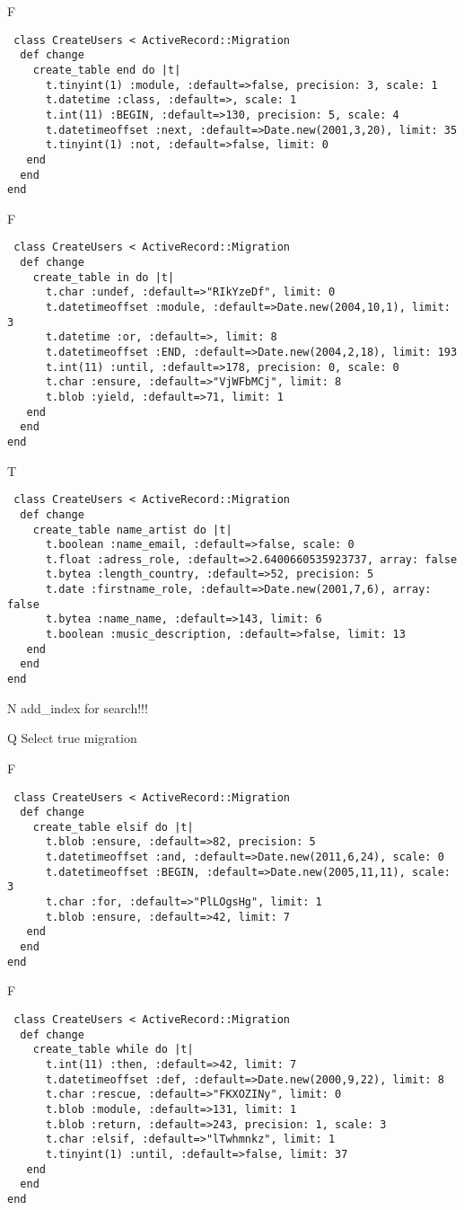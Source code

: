 F
\begin{verbatim}
 class CreateUsers < ActiveRecord::Migration 
  def change 
    create_table end do |t| 
      t.tinyint(1) :module, :default=>false, precision: 3, scale: 1
      t.datetime :class, :default=>, scale: 1
      t.int(11) :BEGIN, :default=>130, precision: 5, scale: 4
      t.datetimeoffset :next, :default=>Date.new(2001,3,20), limit: 35
      t.tinyint(1) :not, :default=>false, limit: 0
   end 
  end 
end
\end{verbatim}

F
\begin{verbatim}
 class CreateUsers < ActiveRecord::Migration 
  def change 
    create_table in do |t| 
      t.char :undef, :default=>"RIkYzeDf", limit: 0
      t.datetimeoffset :module, :default=>Date.new(2004,10,1), limit: 3
      t.datetime :or, :default=>, limit: 8
      t.datetimeoffset :END, :default=>Date.new(2004,2,18), limit: 193
      t.int(11) :until, :default=>178, precision: 0, scale: 0
      t.char :ensure, :default=>"VjWFbMCj", limit: 8
      t.blob :yield, :default=>71, limit: 1
   end 
  end 
end
\end{verbatim}

T
\begin{verbatim}
 class CreateUsers < ActiveRecord::Migration 
  def change 
    create_table name_artist do |t| 
      t.boolean :name_email, :default=>false, scale: 0
      t.float :adress_role, :default=>2.6400660535923737, array: false
      t.bytea :length_country, :default=>52, precision: 5
      t.date :firstname_role, :default=>Date.new(2001,7,6), array: false
      t.bytea :name_name, :default=>143, limit: 6
      t.boolean :music_description, :default=>false, limit: 13
   end 
  end 
end
\end{verbatim}
N
add_index for search!!!
  
Q
Select true migration

F
\begin{verbatim}
 class CreateUsers < ActiveRecord::Migration 
  def change 
    create_table elsif do |t| 
      t.blob :ensure, :default=>82, precision: 5
      t.datetimeoffset :and, :default=>Date.new(2011,6,24), scale: 0
      t.datetimeoffset :BEGIN, :default=>Date.new(2005,11,11), scale: 3
      t.char :for, :default=>"PlLOgsHg", limit: 1
      t.blob :ensure, :default=>42, limit: 7
   end 
  end 
end
\end{verbatim}

F
\begin{verbatim}
 class CreateUsers < ActiveRecord::Migration 
  def change 
    create_table while do |t| 
      t.int(11) :then, :default=>42, limit: 7
      t.datetimeoffset :def, :default=>Date.new(2000,9,22), limit: 8
      t.char :rescue, :default=>"FKXOZINy", limit: 0
      t.blob :module, :default=>131, limit: 1
      t.blob :return, :default=>243, precision: 1, scale: 3
      t.char :elsif, :default=>"lTwhmnkz", limit: 1
      t.tinyint(1) :until, :default=>false, limit: 37
   end 
  end 
end
\end{verbatim}

